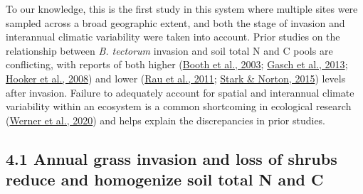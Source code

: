 \documentclass[
  11pt,
  a4paper,
]{article}
\begin{document}
To our knowledge, this is the first study in this system where multiple sites were sampled across a broad geographic extent, and both the stage of invasion and interannual climatic variability were taken into account. Prior studies on the relationship between \emph{B. tectorum} invasion and soil total N and C pools are conflicting, with reports of both higher (\protect\hyperlink{ref-Booth2003}{Booth et al., 2003}; \protect\hyperlink{ref-Gasch2013}{Gasch et al., 2013}; \protect\hyperlink{ref-Hooker2008biogeochem}{Hooker et al., 2008}) and lower (\protect\hyperlink{ref-Rau2011}{Rau et al., 2011}; \protect\hyperlink{ref-Stark2015}{Stark \& Norton, 2015}) levels after invasion. Failure to adequately account for spatial and interannual climate variability within an ecosystem is a common shortcoming in ecological research (\protect\hyperlink{ref-Werner2020}{Werner et al., 2020}) and helps explain the discrepancies in prior studies.

\hypertarget{annual-grass-invasion-and-loss-of-shrubs-reduce-and-homogenize-soil-total-n-and-c}{%
\subsection{4.1 Annual grass invasion and loss of shrubs reduce and homogenize soil total N and C}\label{annual-grass-invasion-and-loss-of-shrubs-reduce-and-homogenize-soil-total-n-and-c}}
\end{document}
